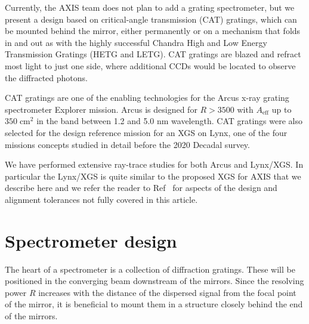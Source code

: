 \documentclass[12pt]{spieman}  %
\begin{document}
\begin{spacing}{1}
Currently, the AXIS team does not plan to add a grating spectrometer, but we present a design based on critical-angle transmission (CAT) gratings, which can be mounted behind the mirror, either permanently or on a mechanism that folds in and out as with the highly successful Chandra High and Low Energy Transmission Gratings (HETG and LETG). CAT gratings are blazed and refract most light to just one side, where additional CCDs would be located to observe the diffracted photons.

CAT gratings\cite{Heilmann:11,doi:10.1117/12.2188525} are one of the enabling technologies for the Arcus x-ray grating spectrometer Explorer mission\cite{doi:10.1117/12.2272818}.  Arcus is designed for $R > 3500$ with $A_\mathrm{eff}$ up to $350\;\mathrm{cm}^2$ in the band between 1.2 and 5.0 nm wavelength. CAT gratings were also selected for the design reference mission for an XGS on Lynx\cite{10.1117/1.JATIS.5.2.021003}, one of the four missions concepts studied in detail before the 2020 Decadal survey\cite{10.1117/1.JATIS.5.2.021001}.

We have performed extensive ray-trace studies for both Arcus\cite{doi:10.1117/12.2273011,guntherarcus} and Lynx/XGS\cite{10.1117/1.JATIS.5.2.021003}. In particular the Lynx/XGS is quite similar to the proposed XGS for AXIS that we describe here and we refer the reader to Ref~ for aspects of the design and alignment tolerances not fully covered in this article.


\section{Spectrometer design}
\label{sect:input}
The heart of a spectrometer is a collection of diffraction gratings. These will be positioned in the converging beam downstream of the mirrors. Since the resolving power $R$ increases with the distance of the dispersed signal from the focal point of the mirror, it is beneficial to mount them in a structure closely behind the end of the mirrors.


\end{spacing}
\end{document}
